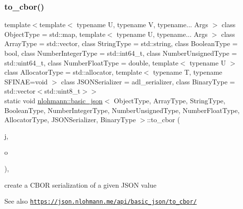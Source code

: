 \subsubsection{\texorpdfstring{to\+\_\+cbor()}{to\_cbor()}\hspace{0.1cm}{\footnotesize\ttfamily [3/3]}}
{\footnotesize\ttfamily template$<$template$<$ typename U, typename V, typename... Args $>$ class Object\+Type = std\+::map, template$<$ typename U, typename... Args $>$ class Array\+Type = std\+::vector, class String\+Type  = std\+::string, class Boolean\+Type  = bool, class Number\+Integer\+Type  = std\+::int64\+\_\+t, class Number\+Unsigned\+Type  = std\+::uint64\+\_\+t, class Number\+Float\+Type  = double, template$<$ typename U $>$ class Allocator\+Type = std\+::allocator, template$<$ typename T, typename S\+F\+I\+N\+A\+E=void $>$ class J\+S\+O\+N\+Serializer = adl\+\_\+serializer, class Binary\+Type  = std\+::vector$<$std\+::uint8\+\_\+t$>$$>$ \\
static void \hyperlink{classnlohmann_1_1basic__json}{nlohmann\+::basic\+\_\+json}$<$ Object\+Type, Array\+Type, String\+Type, Boolean\+Type, Number\+Integer\+Type, Number\+Unsigned\+Type, Number\+Float\+Type, Allocator\+Type, J\+S\+O\+N\+Serializer, Binary\+Type $>$\+::to\+\_\+cbor (\begin{DoxyParamCaption}\item[{const \hyperlink{classnlohmann_1_1basic__json}{basic\+\_\+json}$<$ Object\+Type, Array\+Type, String\+Type, Boolean\+Type, Number\+Integer\+Type, Number\+Unsigned\+Type, Number\+Float\+Type, Allocator\+Type, J\+S\+O\+N\+Serializer, Binary\+Type $>$ \&}]{j,  }\item[{\hyperlink{classnlohmann_1_1detail_1_1output__adapter}{detail\+::output\+\_\+adapter}$<$ char $>$}]{o }\end{DoxyParamCaption})\hspace{0.3cm}{\ttfamily [inline]}, {\ttfamily [static]}}



create a C\+B\+OR serialization of a given J\+S\+ON value 

\begin{DoxySeeAlso}{See also}
\href{https://json.nlohmann.me/api/basic_json/to_cbor/}{\tt https\+://json.\+nlohmann.\+me/api/basic\+\_\+json/to\+\_\+cbor/} 
\end{DoxySeeAlso}
\mbox{\label{classnlohmann_1_1basic__json_ae4cb21fa2c0b24c494077f5e173c43e3}} 
